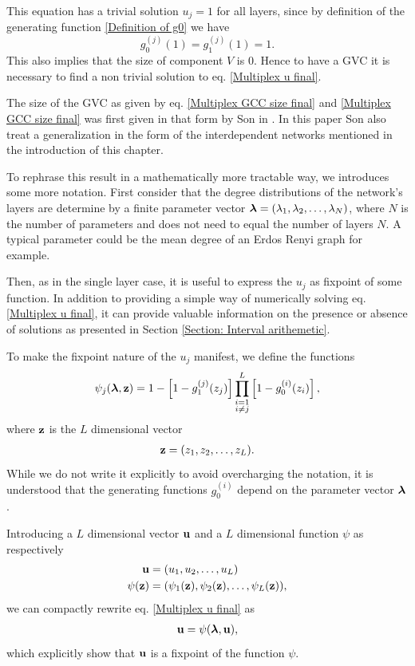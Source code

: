 \documentclass[
11pt, %
english, %
singlespacing, %
nolistspacing, %
liststotoc, %
headsepline, %
]{MastersDoctoralThesis} %
\begin{document}
This equation has a trivial solution $u_j = 1$ for all layers, since by definition of the generating function \eqref{Definition of g0} we have
\begin{equation}
	g_0^{(j)}(1) = g_1^{(j)}(1) = 1.
\end{equation}
This also implies that the size of component $V$ is $0$. Hence to have a GVC it is necessary to find a non trivial solution to eq. \eqref{Multiplex u final}.

The size of the GVC as given by eq. \eqref{Multiplex GCC size final} and \eqref{Multiplex GCC size final} was first given in that form by Son \etal{} in \cite{son2012percolation}. In this paper Son \etal{} also treat a generalization in the form of the interdependent networks mentioned in the introduction of this chapter.

To rephrase this result in a mathematically more tractable way, we introduces some more notation. First consider that the degree distributions of the network's layers are determine by a finite parameter vector $\boldsymbol{\mathrm{\lambda}} = (\lambda_1, \lambda_2, \dots, \lambda_N)$, where $N$ is the number of parameters and does not need to equal the number of layers $N$. A typical parameter could be the mean degree of an Erdos Renyi graph for example.


Then, as in the single layer case, it is useful to express the $u_j$ as fixpoint of some function. In addition to providing a simple way of numerically solving eq. \eqref{Multiplex u final}, it can provide valuable information on the presence or absence of solutions as presented in Section \ref{Section: Interval arithemetic}.

To make the fixpoint nature of the $u_j$ manifest, we define the functions
\begin{align}
	\psi_j(\boldsymbol{\mathrm{\lambda}}, \boldsymbol{\mathrm{z}}) = 1 - \left[1 - g_1^{(j)}(z_j) \right] \prod_{\substack{i = 1 \\ i \neq j}}^{L}  \left[1 - g_0^{(i)}(z_i) \right], \label{Definition of psi functions}
\end{align}
where $\boldsymbol{\mathrm{z}}$ is the $L$ dimensional vector
\begin{align}
	\boldsymbol{\mathrm{z}} = (z_1, z_2, \dots, z_L).
\end{align}
While we do not write it explicitly to avoid overcharging the notation, it is understood that the generating functions $g_0^{(i)}$ depend on the parameter vector $\boldsymbol{\mathrm{\lambda}}$.

Introducing a $L$ dimensional vector $\boldsymbol{\mathrm{u}}$ and a $L$ dimensional function $\psi$ as respectively
\begin{align}
	\boldsymbol{\mathrm{u}} &= (u_1, u_2, \dots, u_L) \\
	\psi(\boldsymbol{\mathrm{z}}) &= (\psi_1(\boldsymbol{\mathrm{z}}), \psi_2(\boldsymbol{\mathrm{z}}), \dots, \psi_L(\boldsymbol{\mathrm{z}})),
\end{align}
we can compactly rewrite eq. \eqref{Multiplex u final} as
\begin{align}
	\boldsymbol{\mathrm{u}} = \psi(\boldsymbol{\mathrm{\lambda}}, \boldsymbol{\mathrm{u}}), \label{uvec as a fixpoint of psi}
\end{align}
which explicitly show that $\boldsymbol{\mathrm{u}}$ is a fixpoint of the function $\psi$.
\end{document}
